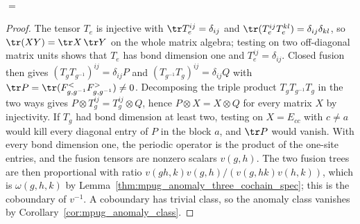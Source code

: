 \begin{center}
    \tenkzkernel
    \begin{tenkz}[rows={op,op}, cols=1, west=open, east=open]
         \\
    \end{tenkz}
    \quad$=$\quad
    \begin{tenkz}[rows={op,op}, cols=3, bonds=none]
        \tn[at=(2,2), skin=none]{}
    \end{tenkz}
\end{center}

\begin{proof}\leanok
    The tensor $T_e$ is injective with $\tr T_e^{ij}=\delta_{ij}$ and
    $\tr(T_e^{ij}T_e^{kl})=\delta_{ij}\delta_{kl}$, so
    $\tr(XY)=\tr X\,\tr Y$ on the whole matrix algebra; testing on two
    off-diagonal matrix units shows that $T_e$ has bond dimension one and
    $T_e^{ij}=\delta_{ij}$. Closed fusion then gives
    $(T_gT_{g^{-1}})^{ij}=\delta_{ij}P$ and
    $(T_{g^{-1}}T_g)^{ij}=\delta_{ij}Q$ with
    $\tr P=\tr(F^<_{g,g^{-1}}F^>_{g,g^{-1}})\neq0$. Decomposing the triple
    product $T_gT_{g^{-1}}T_g$ in the two ways gives
    $P\otimes T_g^{ij}=T_g^{ij}\otimes Q$, hence $P\otimes X=X\otimes Q$ for
    every matrix $X$ by injectivity. If $T_g$ had bond dimension at least
    two, testing on $X=E_{cc}$ with $c\neq a$ would kill every diagonal
    entry of $P$ in the block $a$, and $\tr P$ would vanish. With every bond
    dimension one, the periodic operator is the product of the one-site
    entries, and the fusion tensors are nonzero scalars $v(g,h)$. The two
    fusion trees are then proportional with ratio
    $v(gh,k)v(g,h)/(v(g,hk)v(h,k))$, which is $\omega(g,h,k)$ by
    Lemma~\ref{thm:mpug_anomaly_three_cochain_spec}; this is the
    coboundary of $v^{-1}$. A coboundary has trivial class, so the anomaly
    class vanishes by Corollary~\ref{cor:mpug_anomaly_class}.
\end{proof}

